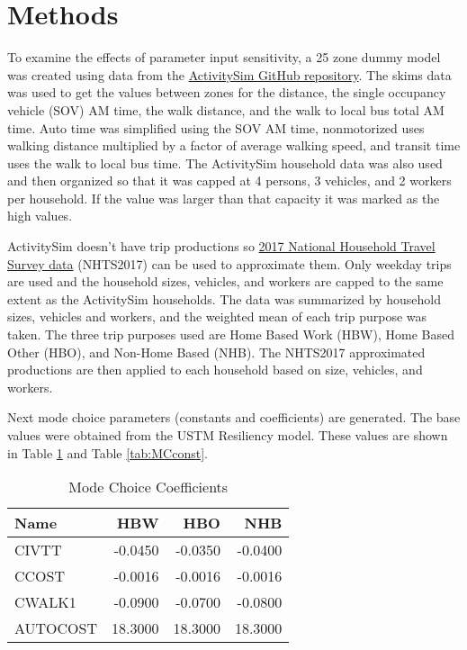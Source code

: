 \documentclass[3p, authoryear, review]{elsarticle} %
\begin{document}
\hypertarget{methods}{%
\section{Methods}\label{methods}}

To examine the effects of parameter input sensitivity, a 25 zone dummy model was created using data from the \href{https://github.com/ActivitySim/activitysim}{ActivitySim GitHub repository}. The skims data was used to get the values between zones for the distance, the single occupancy vehicle (SOV) AM time, the walk distance, and the walk to local bus total AM time. Auto time was simplified using the SOV AM time, nonmotorized uses walking distance multiplied by a factor of average walking speed, and transit time uses the walk to local bus time. The ActivitySim household data was also used and then organized so that it was capped at 4 persons, 3 vehicles, and 2 workers per household. If the value was larger than that capacity it was marked as the high values.

ActivitySim doesn't have trip productions so \href{https://github.com/byu-transpolab/nhts2017}{2017 National Household Travel Survey data} (NHTS2017) can be used to approximate them. Only weekday trips are used and the household sizes, vehicles, and workers are capped to the same extent as the ActivitySim households. The data was summarized by household sizes, vehicles and workers, and the weighted mean of each trip purpose was taken. The three trip purposes used are Home Based Work (HBW), Home Based Other (HBO), and Non-Home Based (NHB). The NHTS2017 approximated productions are then applied to each household based on size, vehicles, and workers.

Next mode choice parameters (constants and coefficients) are generated. The base values were obtained from the USTM Resiliency model. These values are shown in Table \ref{tab:MCcoeff} and Table \ref{tab:MCconst}.

\begin{table}

\caption{\label{tab:MCcoeff}Mode Choice Coefficients}
\centering
\begin{tabular}[t]{l|r|r|r}
\hline
Name & HBW & HBO & NHB\\
\hline
CIVTT & -0.0450 & -0.0350 & -0.0400\\
\hline
CCOST & -0.0016 & -0.0016 & -0.0016\\
\hline
CWALK1 & -0.0900 & -0.0700 & -0.0800\\
\hline
AUTOCOST & 18.3000 & 18.3000 & 18.3000\\
\hline
\end{tabular}
\end{table}
\end{document}
